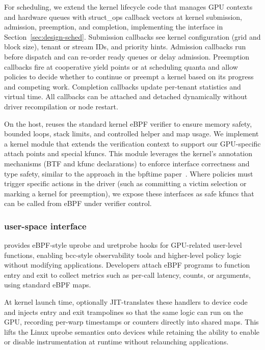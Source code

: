 For scheduling, we extend the kernel lifecycle code that manages GPU contexts and
hardware queues with struct\_ops callback vectors at kernel submission, admission,
preemption, and completion, implementing the interface in
Section~\ref{sec:design-sched}. Submission callbacks see kernel configuration
(grid and block size), tenant or stream IDs, and priority hints. Admission
callbacks run before dispatch and can re-order ready queues or delay admission.
Preemption callbacks fire at cooperative yield points or at scheduling quanta and
allow policies to decide whether to continue or preempt a kernel based on its
progress and competing work. Completion callbacks update per-tenant statistics
and virtual time. All callbacks can be attached and detached dynamically without
driver recompilation or node restart.

On the host, \sys reuses the standard kernel eBPF verifier to ensure memory
safety, bounded loops, stack limits, and controlled helper and map usage. We implement
a kernel module that extends the verification context to support our GPU-specific attach points
and special kfuncs. This module leverages the kernel's annotation mechanisms (BTF and kfunc
declarations) to enforce interface correctness and type safety, similar to the approach
in the bpftime paper~\cite{bpftime}. Where policies must trigger specific actions in the driver
(such as committing a victim selection or marking a kernel for preemption), we expose these
interfaces as safe kfuncs that can be called from eBPF under verifier control.

\subsubsection{\sysdevice user-space interface}

\sysdevice provides eBPF-style uprobe and uretprobe hooks for GPU-related
user-level functions, enabling bcc-style observability tools and higher-level
policy logic without modifying applications. Developers attach eBPF programs to
function entry and exit to collect metrics such as per-call latency, counts, or
arguments, using standard eBPF maps.

At kernel launch time, \sys optionally JIT-translates these handlers to device
code and injects entry and exit trampolines so that the same logic can run on
the GPU, recording per-warp timestamps or counters directly into shared maps.
This lifts the Linux uprobe semantics onto devices while retaining the ability
to enable or disable instrumentation at runtime without relaunching applications.

